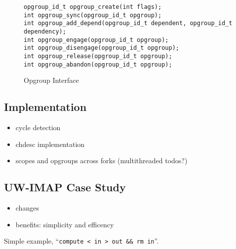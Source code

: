 \begin{figure}[htb]
\begin{small}
\texttt{opgroup\_id\_t opgroup\_create(int flags);}\\
\texttt{int opgroup\_sync(opgroup\_id\_t opgroup);}\\
\texttt{int opgroup\_add\_depend(opgroup\_id\_t dependent, opgroup\_id\_t dependency);}\\
\texttt{int opgroup\_engage(opgroup\_id\_t opgroup);}\\
\texttt{int opgroup\_disengage(opgroup\_id\_t opgroup);}\\
\texttt{int opgroup\_release(opgroup\_id\_t opgroup);}\\
\texttt{int opgroup\_abandon(opgroup\_id\_t opgroup);}
\end{small}
\caption{\label{fig:opgroup-interface} Opgroup Interface}
\end{figure}

\subsection{Implementation}
\begin{itemize}
\item cycle detection
\item chdesc implementation
\item scopes and opgroups across forks (multithreaded todos?)
\end{itemize}

\subsection{UW-IMAP Case Study}
\begin{itemize}
\item changes
\item benefits: simplicity and efficency
\end{itemize}

Simple example, ``\texttt{compute < in > out \&\& rm in}''.
